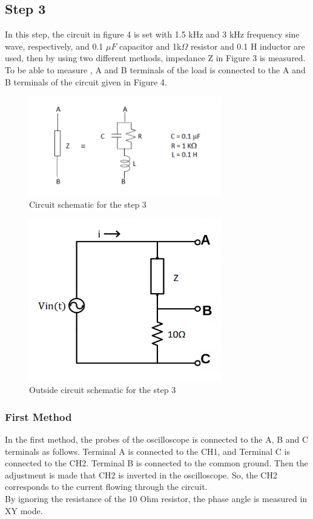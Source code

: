 \documentclass[letterpaper,12pt]{article}
\begin{document}
\subsection{Step 3}

In this step, the circuit in figure 4 is set with 1.5 kHz and 3 kHz frequency sine wave, respectively, and 0.1 \(\mu F\) capacitor and 1k\(\Omega \) resistor and 0.1 H inductor are used, then by using two different methods, impedance Z in Figure 3 is measured. To be able to measure , A and B terminals of the load is connected to the A and B terminals of the circuit given in Figure 4.
\begin{figure}[H]
    \centering
    \includegraphics[width = 0.75\textwidth]{3SCH.png}
    \caption{Circuit schematic for the step 3}
\end{figure} 

\begin{figure}[H]
    \centering
    \includegraphics[width = 0.75\textwidth]{3_1SCH.png}
    \caption{Outside circuit schematic for the step 3}
\end{figure} 

\subsubsection{First Method}
In the first method, the probes of the oscilloscope is connected to the A, B and C terminals as follows. Terminal A is connected to the CH1, and Terminal C is connected to the CH2. Terminal B is connected to the common ground. Then the adjustment is made that CH2 is inverted in the oscilloscope. So, the CH2 corresponds to the current flowing through the circuit. \\ By ignoring the resistance of the 10 Ohm resistor, the phase angle is measured in XY mode. 
\end{document}
